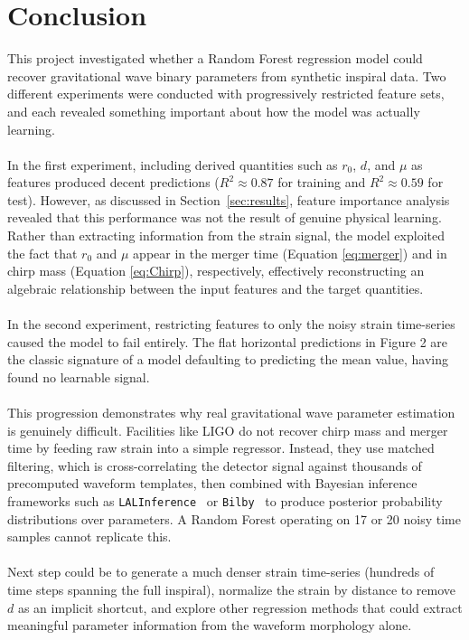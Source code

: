 \documentclass[12pt]{article}
\begin{document}
\section{Conclusion}
\label{conclusion}
This project investigated whether a Random Forest regression model could recover gravitational wave binary parameters from synthetic inspiral data. Two different experiments were conducted with progressively restricted feature sets, and each revealed something important about how the model was actually learning.\\
\\In the first experiment, including derived quantities such as $r_0$, $d$, and $\mu$ as features produced decent predictions ($R^2 \approx 0.87$ for training and $R^2 \approx 0.59$ for test). However, as discussed in Section~\ref{sec:results}, feature importance  analysis revealed that this performance was not the result of genuine physical learning. Rather than extracting information from the strain signal, the model exploited the fact that $r_0$ and $\mu$ appear in the merger time (Equation 
\eqref{eq:merger}) and in chirp mass (Equation \eqref{eq:Chirp}), respectively, effectively reconstructing an algebraic relationship between the input features and the target quantities.\\
\\In the second experiment, restricting features to only the noisy strain time-series caused the model to fail entirely. The flat horizontal predictions in Figure 2 are the classic signature of a model defaulting to predicting the mean value, having found no learnable signal.\\
\\This progression demonstrates why real gravitational wave parameter estimation is genuinely difficult. Facilities like LIGO do not recover chirp mass and merger time by feeding raw strain into a simple regressor. 
Instead, they use matched filtering, which is cross-correlating the detector signal against thousands of precomputed waveform templates, then combined with Bayesian inference frameworks such as \texttt{LALInference}~\cite{Veitch2015} or \texttt{Bilby}~\cite{Ashton2019} to produce posterior probability distributions over parameters. A Random Forest operating on 17 or 20 noisy time samples cannot replicate this.\\
\\Next step could be to generate a much denser strain time-series (hundreds of time steps spanning the full inspiral), normalize the strain by distance to remove $d$ as an implicit shortcut, and explore other regression methods that could extract meaningful parameter information from the waveform morphology alone.

\newpage


\end{document}
